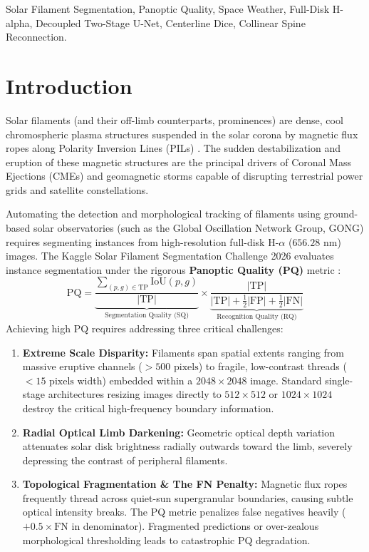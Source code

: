 \documentclass[conference]{IEEEtran}
\begin{document}
\begin{IEEEkeywords}
Solar Filament Segmentation, Panoptic Quality, Space Weather, Full-Disk H-alpha, Decoupled Two-Stage U-Net, Centerline Dice, Collinear Spine Reconnection.
\end{IEEEkeywords}

\section{Introduction}
Solar filaments (and their off-limb counterparts, prominences) are dense, cool chromospheric plasma structures suspended in the solar corona by magnetic flux ropes along Polarity Inversion Lines (PILs) \cite{parenti2014}. The sudden destabilization and eruption of these magnetic structures are the principal drivers of Coronal Mass Ejections (CMEs) and geomagnetic storms capable of disrupting terrestrial power grids and satellite constellations.

Automating the detection and morphological tracking of filaments using ground-based solar observatories (such as the Global Oscillation Network Group, GONG) requires segmenting instances from high-resolution full-disk H-$\alpha$ ($656.28\text{ nm}$) images. The Kaggle Solar Filament Segmentation Challenge 2026 evaluates instance segmentation under the rigorous \textbf{Panoptic Quality (PQ)} metric \cite{kirillov2019panoptic}:
\begin{equation}
\text{PQ} = \underbrace{\frac{\sum_{(p, g) \in \text{TP}} \text{IoU}(p, g)}{|\text{TP}|}}_{\text{Segmentation Quality (SQ)}} \times \underbrace{\frac{|\text{TP}|}{|\text{TP}| + \frac{1}{2}|\text{FP}| + \frac{1}{2}|\text{FN}|}}_{\text{Recognition Quality (RQ)}}
\end{equation}
Achieving high PQ requires addressing three critical challenges:
\begin{enumerate}
    \item \textbf{Extreme Scale Disparity:} Filaments span spatial extents ranging from massive eruptive channels ($>500\text{ pixels}$) to fragile, low-contrast threads ($<15\text{ pixels}$ width) embedded within a $2048\times2048$ image. Standard single-stage architectures resizing images directly to $512\times512$ or $1024\times1024$ destroy the critical high-frequency boundary information.
    \item \textbf{Radial Optical Limb Darkening:} Geometric optical depth variation attenuates solar disk brightness radially outwards toward the limb, severely depressing the contrast of peripheral filaments.
    \item \textbf{Topological Fragmentation & The FN Penalty:} Magnetic flux ropes frequently thread across quiet-sun supergranular boundaries, causing subtle optical intensity breaks. The PQ metric penalizes false negatives heavily ($+0.5\times \text{FN}$ in denominator). Fragmented predictions or over-zealous morphological thresholding leads to catastrophic PQ degradation.
\end{enumerate}
\end{document}
